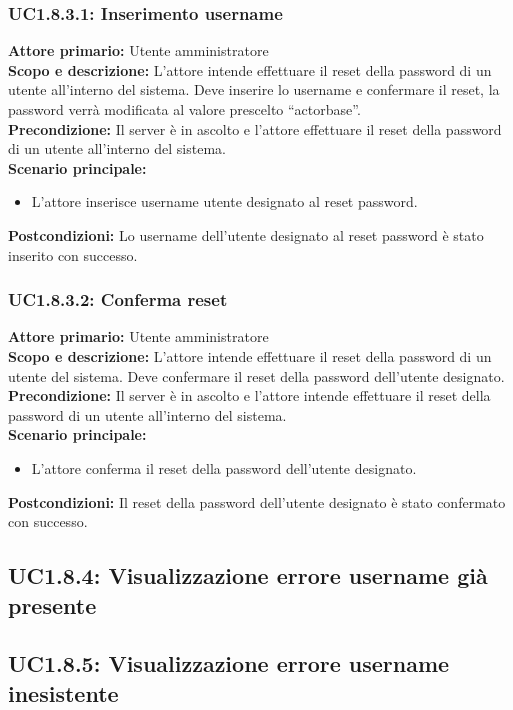 \documentclass{scalatekids-article}
\begin{document}
\subsubsection{UC1.8.3.1: Inserimento username}

\textbf{Attore primario:} Utente amministratore\\
\textbf{Scopo e descrizione:} L'attore intende effettuare il reset della password di un utente all'interno del sistema. Deve inserire lo username e confermare il reset, la password
verrà modificata al valore prescelto ``actorbase''.\\
\textbf{Precondizione:} Il server è in ascolto e l'attore effettuare il reset della password di un utente all'interno del sistema.\\
\textbf{Scenario principale:}
\begin{itemize}
\item L'attore inserisce username utente designato al reset password.
\end{itemize}
\textbf{Postcondizioni:} Lo username dell'utente designato al reset password è stato inserito con successo.

\subsubsection{UC1.8.3.2: Conferma reset}

\textbf{Attore primario:} Utente amministratore\\
\textbf{Scopo e descrizione:} L'attore intende effettuare il reset della password di un utente del sistema. Deve confermare il reset della password dell'utente designato.\\
\textbf{Precondizione:} Il server è in ascolto e l'attore intende effettuare il reset della password di un utente all'interno del sistema.\\
\textbf{Scenario principale:}
\begin{itemize}
\item L'attore conferma il reset della password dell'utente designato.
\end{itemize}
\textbf{Postcondizioni:} Il reset della password dell'utente designato è stato confermato con successo.

\subsection{UC1.8.4: Visualizzazione errore username già presente}

\subsection{UC1.8.5: Visualizzazione errore username inesistente}
\end{document}
